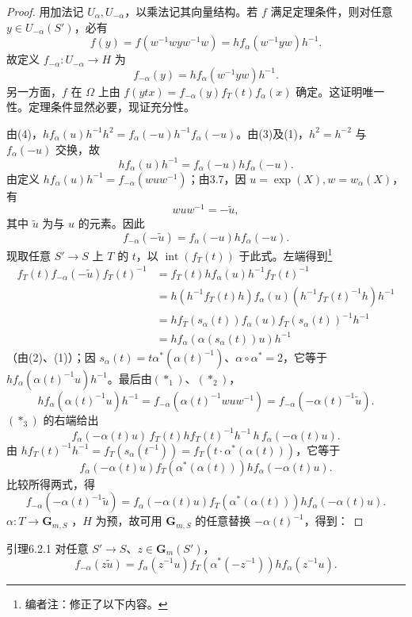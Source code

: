 \begin{proof}
用加法记 $U_\alpha,U_{-\alpha}$，以乘法记其向量结构。若 $f$ 满足定理条件，则对任意 $y\in U_{-\alpha}(S')$，必有
\[f(y)=f(w^{-1}wyw^{-1}w)=hf_\alpha(w^{-1}yw)h^{-1}.\]
故定义 $f_{-\alpha}:U_{-\alpha}\to H$ 为
\[f_{-\alpha}(y)=hf_\alpha(w^{-1}yw)h^{-1}.\tag{$*_1$}\]
另一方面，$f$ 在 $\Omega$ 上由 $f(ytx)=f_{-\alpha}(y)f_T(t)f_\alpha(x)$ 确定。这证明唯一性。定理条件显然必要，现证充分性。

由(4)，$hf_\alpha(u)h^{-1}h^2=f_\alpha(-u)h^{-1}f_\alpha(-u)$。由(3)及(1)，$h^2=h^{-2}$ 与 $f_\alpha(-u)$ 交换，故
\[hf_\alpha(u)h^{-1}=f_\alpha(-u)hf_\alpha(-u).\]
由定义 $hf_\alpha(u)h^{-1}=f_{-\alpha}(wuw^{-1})$；由3.7，因 $u=\exp(X),w=w_\alpha(X)$，有
\[wuw^{-1}=-\widetilde u,\tag{$*_2$}\]
其中 $\widetilde u$ 为与 $u$ 的元素。因此
\[f_{-\alpha}(-\widetilde u)=f_\alpha(-u)hf_\alpha(-u).\tag{$*_3$}\]
现取任意 $S'\to S$ 上 $T$ 的 $t$，以 $\operatorname{int}(f_T(t))$ 于此式。左端得到\footnote{编者注：修正了以下内容。}
\[\begin{aligned}f_T(t)f_{-\alpha}(-\widetilde u)f_T(t)^{-1}&=f_T(t)hf_\alpha(u)h^{-1}f_T(t)^{-1}\\&=h(h^{-1}f_T(t)h)f_\alpha(u)(h^{-1}f_T(t)^{-1}h)h^{-1}\\&=hf_T(s_\alpha(t))f_\alpha(u)f_T(s_\alpha(t))^{-1}h^{-1}\\&=hf_\alpha(\alpha(s_\alpha(t))u)h^{-1}\end{aligned}\]
（由(2)、(1)）；因 $s_\alpha(t)=t\alpha^*(\alpha(t)^{-1})$、$\alpha\circ\alpha^*=2$，它等于 $hf_\alpha(\alpha(t)^{-1}u)h^{-1}$。最后由$(*_1)$、$(*_2)$，
\[hf_\alpha(\alpha(t)^{-1}u)h^{-1}=f_{-\alpha}(\alpha(t)^{-1}wuw^{-1})=f_{-\alpha}(-\alpha(t)^{-1}\widetilde u).\]
$(*_3)$ 的右端给出
\[f_\alpha(-\alpha(t)u)\,f_T(t)hf_T(t)^{-1}h^{-1}\,h\,f_\alpha(-\alpha(t)u).\]
由 $hf_T(t)^{-1}h^{-1}=f_T(s_\alpha(t^{-1}))=f_T(t\cdot\alpha^*(\alpha(t)))$，它等于
\[f_\alpha(-\alpha(t)u)f_T(\alpha^*(\alpha(t)))hf_\alpha(-\alpha(t)u).\]
比较所得两式，得
\[f_{-\alpha}(-\alpha(t)^{-1}\widetilde u)=f_\alpha(-\alpha(t)u)f_T(\alpha^*(\alpha(t)))hf_\alpha(-\alpha(t)u).\]
$\alpha:T\to\mathbf G_{m,S}$ ，$H$ 为预，故可用 $\mathbf G_{m,S}$ 的任意替换 $-\alpha(t)^{-1}$，得到：
\end{proof}
\begin{SGAresult}{引理}{6.2.1}
对任意 $S'\to S$、$z\in\mathbf G_m(S')$，
\[f_{-\alpha}(z\widetilde u)=f_\alpha(z^{-1}u)f_T(\alpha^*(-z^{-1}))hf_\alpha(z^{-1}u).\]
\end{SGAresult}

